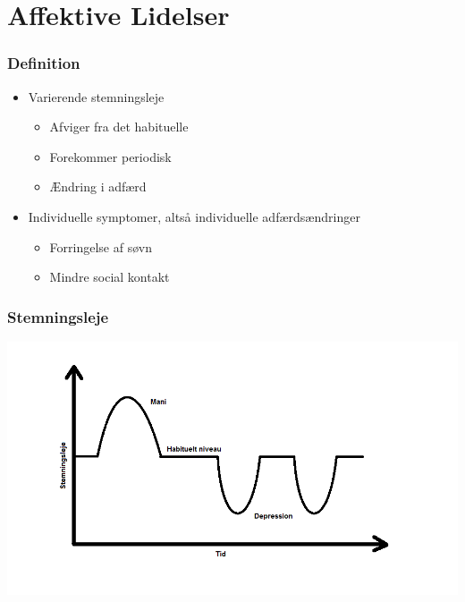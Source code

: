 \section{Affektive Lidelser}

\begin{frame}
\frametitle{Definition}

\begin{itemize}
\item Varierende stemningsleje
\begin{itemize}
\item Afviger fra det habituelle
\item Forekommer periodisk
\item Ændring i adfærd
\end{itemize}
\item Individuelle symptomer, altså individuelle adfærdsændringer
\begin{itemize}
\item Forringelse af søvn
\item Mindre social kontakt
\end{itemize}
\end{itemize}

\end{frame}

\begin{frame}
\frametitle{Stemningsleje}

\includegraphics[width=\textwidth]{../grafik/affektivstemningsleje.png}

\end{frame}
